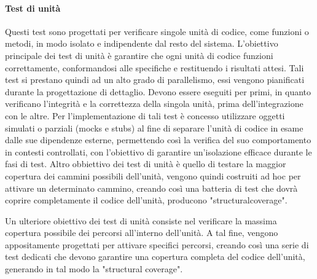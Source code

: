 \paragraph{Test di unità}
Questi test sono progettati per verificare singole unità di codice, come funzioni o metodi, in modo isolato e indipendente dal resto del sistema. L'obiettivo principale dei test di unità è garantire che ogni unità di codice funzioni correttamente, conformandosi alle specifiche e restituendo i risultati attesi.
Tali test si prestano quindi ad un alto grado di parallelismo, essi vengono pianificati durante
la progettazione di dettaglio.
Devono essere eseguiti per primi, in quanto verificano l’integrità e la correttezza della singola
unità, prima dell’integrazione con le altre.
Per l'implementazione di tali test è concesso utilizzare oggetti simulati o parziali (mocks e stubs) al fine di separare l'unità di codice in esame dalle sue dipendenze esterne, permettendo così la verifica del suo comportamento in contesti controllati, con l'obiettivo di garantire un'isolazione efficace durante le fasi di test.
Altro obbiettivo dei test di unità è quello di testare la maggior copertura dei cammini possibili dell'unità, vengono quindi costruiti
ad hoc per attivare un determinato cammino, creando così una batteria di test che dovrà coprire completamente il codice dell'unità, producono "structuralcoverage".

Un ulteriore obiettivo dei test di unità consiste nel verificare la massima copertura possibile dei percorsi all'interno dell'unità. A tal fine, vengono appositamente progettati per attivare specifici percorsi, creando così una serie di test dedicati che devono garantire una copertura completa del codice dell'unità, generando in tal modo la "structural coverage".



